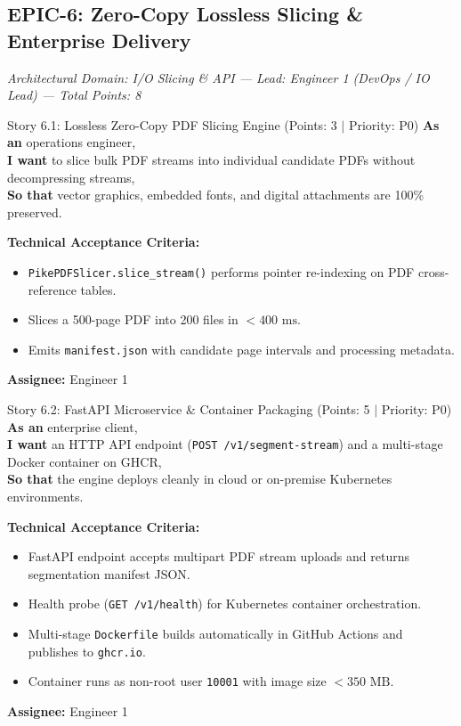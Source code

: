 \documentclass[11pt,a4paper]{article}
\begin{document}
\subsection{EPIC-6: Zero-Copy Lossless Slicing \& Enterprise Delivery}
\textit{Architectural Domain: I/O Slicing \& API --- Lead: Engineer 1 (DevOps / IO Lead) --- Total Points: 8}

\vspace{0.5em}

\begin{storybox}{Story 6.1: Lossless Zero-Copy PDF Slicing Engine (Points: 3 $|$ Priority: P0)}
\textbf{As an} operations engineer, \\
\textbf{I want} to slice bulk PDF streams into individual candidate PDFs without decompressing streams, \\
\textbf{So that} vector graphics, embedded fonts, and digital attachments are 100\% preserved.

\vspace{0.3em}
\textbf{Technical Acceptance Criteria:}
\begin{itemize}[leftmargin=1.2em, itemsep=1pt]
    \item \texttt{PikePDFSlicer.slice\_stream()} performs pointer re-indexing on PDF cross-reference tables.
    \item Slices a 500-page PDF into 200 files in $<400\text{ ms}$.
    \item Emits \texttt{manifest.json} with candidate page intervals and processing metadata.
\end{itemize}
\textbf{Assignee:} Engineer 1
\end{storybox}

\begin{storybox}{Story 6.2: FastAPI Microservice \& Container Packaging (Points: 5 $|$ Priority: P0)}
\textbf{As an} enterprise client, \\
\textbf{I want} an HTTP API endpoint (\texttt{POST /v1/segment-stream}) and a multi-stage Docker container on GHCR, \\
\textbf{So that} the engine deploys cleanly in cloud or on-premise Kubernetes environments.

\vspace{0.3em}
\textbf{Technical Acceptance Criteria:}
\begin{itemize}[leftmargin=1.2em, itemsep=1pt]
    \item FastAPI endpoint accepts multipart PDF stream uploads and returns segmentation manifest JSON.
    \item Health probe (\texttt{GET /v1/health}) for Kubernetes container orchestration.
    \item Multi-stage \texttt{Dockerfile} builds automatically in GitHub Actions and publishes to \texttt{ghcr.io}.
    \item Container runs as non-root user \texttt{10001} with image size $<350\text{ MB}$.
\end{itemize}
\textbf{Assignee:} Engineer 1
\end{storybox}
\end{document}
